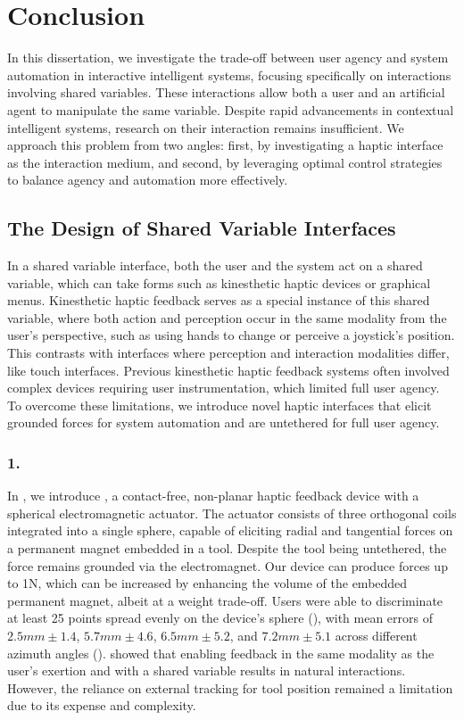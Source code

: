 \chapter{Conclusion}
\label{ch:summary}
In this dissertation, we investigate the trade-off between user agency and system automation in interactive intelligent systems, focusing specifically on interactions involving shared variables. These interactions allow both a user and an artificial agent to manipulate the same variable. Despite rapid advancements in contextual intelligent systems, research on their interaction remains insufficient. We approach this problem from two angles: first, by investigating a haptic interface as the interaction medium, and second, by leveraging optimal control strategies to balance agency and automation more effectively.

\section*{The Design of Shared Variable Interfaces}
In a shared variable interface, both the user and the system act on a shared variable, which can take forms such as kinesthetic haptic devices or graphical menus. Kinesthetic haptic feedback serves as a special instance of this shared variable, where both action and perception occur in the same modality from the user's perspective, such as using hands to change or perceive a joystick's position. This contrasts with interfaces where perception and interaction modalities differ, like touch interfaces. Previous kinesthetic haptic feedback systems often involved complex devices requiring user instrumentation, which limited full user agency. To overcome these limitations, we introduce novel haptic interfaces that elicit grounded forces for system automation and are untethered for full user agency.

\subsection*{1. \omniHapTitle}
In , we introduce \omniHap, a contact-free, non-planar haptic feedback device with a spherical electromagnetic actuator. The actuator consists of three orthogonal coils integrated into a single sphere, capable of eliciting radial and tangential forces on a permanent magnet embedded in a tool. Despite the tool being untethered, the force remains grounded via the electromagnet. Our device can produce forces up to 1N, which can be increased by enhancing the volume of the embedded permanent magnet, albeit at a weight trade-off. Users were able to discriminate at least 25 points spread evenly on the device's sphere (), with mean errors of $2.5mm \pm 1.4$, $5.7mm \pm 4.6$, $6.5mm \pm 5.2$, and $7.2mm \pm 5.1$ across different azimuth angles (). \omniHap showed that enabling feedback in the same modality as the user's exertion and with a shared variable results in natural interactions. However, the reliance on external tracking for tool position remained a limitation due to its expense and complexity.

